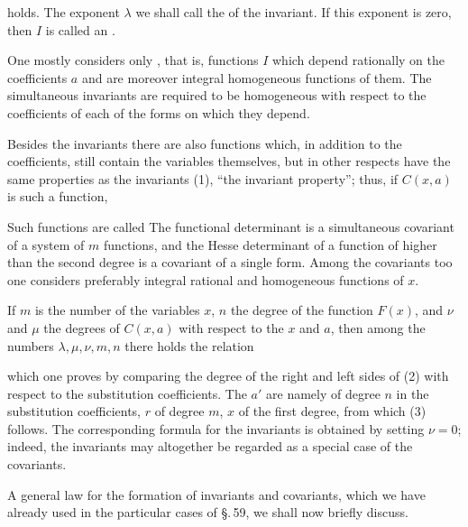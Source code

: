 holds. The exponent $\lambda$ we shall call the  of the
invariant. If this exponent is zero, then $I$ is called an
.

One mostly considers only ,
that is, functions $I$ which depend rationally on the coefficients $a$
and are moreover integral homogeneous functions of
them. The simultaneous invariants are required to be homogeneous
with respect to the coefficients of each of the forms on which
they depend.

Besides the invariants there are also functions which, in addition to
the coefficients, still contain the variables themselves, but in other
respects have the same properties as the invariants (1), ``the invariant
property''; thus, if $C(x, a)$ is such a
function,


Such functions are called 
The functional determinant is a simultaneous covariant of a
system of $m$ functions, and the Hesse determinant
of a function of higher than the second degree is a
covariant of a single form. Among the covariants too
one considers preferably integral rational and homogeneous
functions of $x$.

If $m$ is the number of the variables $x$, $n$ the degree of the function
$F(x)$, and $\nu$ and $\mu$ the degrees of $C(x, a)$ with respect to the $x$ and
$a$, then among the numbers $\lambda, \mu, \nu, m, n$ there holds the relation


which one proves by comparing the degree of the right and
left sides of (2) with respect to the substitution coefficients.
The $a'$ are namely of degree $n$ in the substitution coefficients,
$r$ of degree $m$, $x$ of the first degree, from which
(3) follows. The corresponding formula for the invariants
is obtained by setting $\nu = 0$; indeed, the
invariants may altogether be regarded as a special case of the
covariants.

A general law for the formation of invariants and
covariants, which we have already used in the particular cases of \S.\,59,
we shall now briefly discuss.
